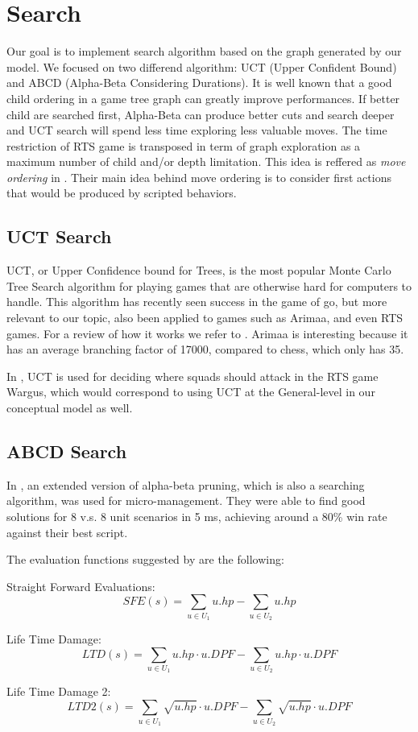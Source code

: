 \section{Search}

Our goal is to implement search algorithm based on the graph generated by our model. 
We focused on two differend algorithm: UCT (Upper Confident Bound) and ABCD (Alpha-Beta Considering Durations).  
It is well known that a good child ordering in a game tree graph can greatly improve performances.  
If better child are searched first, Alpha-Beta can produce better cuts and search deeper and UCT search will spend less time exploring less valuable moves. 
The time restriction of RTS game is transposed in term of graph exploration as a maximum number of child and/or depth limitation. 
This idea is reffered as \emph{move ordering} in \cite{portfolio}.
Their main idea behind move ordering is to consider first actions that would be produced by scripted behaviors.

\subsection{UCT Search}
UCT, or Upper Confidence bound for Trees, is the most popular Monte Carlo Tree Search algorithm for playing games that are otherwise hard for computers to handle.
This algorithm has recently seen success in the game of go, but more relevant to our topic, also been applied to games such as Arimaa, and even RTS games. For a review of how it works we refer to \cite{mcts}.
Arimaa is interesting because it has an average branching factor of 17000, compared to chess, which only has 35. \cite{arimaawiki}

In \cite{wargusuct}, UCT is used for deciding where squads should attack in the RTS game Wargus, which would correspond to using UCT at the General-level in our conceptual model as well.

\subsection{ABCD Search}
In \cite{abcd}, an extended version of alpha-beta pruning, which is also a searching algorithm, was used for micro-management. 
They were able to find good solutions for 8 v.s. 8 unit scenarios in 5 ms, achieving around a 80\% win rate against their best script.

The evaluation functions suggested by \cite{abcd} are the following:
\begin{shortitem}
\item Straight Forward Evaluations:
$$
    \displaystyle{SFE(s) = \sum_{u \in U_1} u.hp - \sum_{u \in U_2} u.hp } 
$$

\item Life Time Damage:
$$
    \displaystyle{LTD(s) = \sum_{u \in U_1} u.hp \cdot u.DPF- \sum_{u \in U_2} u.hp \cdot u.DPF } 
$$

\item Life Time Damage 2:
$$
    \displaystyle{LTD2(s) = \sum_{u \in U_1} \sqrt{u.hp} \cdot u.DPF - \sum_{u \in U_2} \sqrt{u.hp} \cdot u.DPF } 
$$
\end{shortitem}

